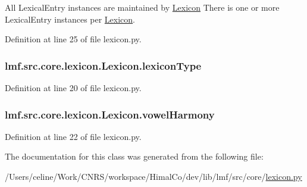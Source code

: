 All Lexical\+Entry instances are maintained by \hyperlink{classlmf_1_1src_1_1core_1_1lexicon_1_1_lexicon}{Lexicon} There is one or more Lexical\+Entry instances per \hyperlink{classlmf_1_1src_1_1core_1_1lexicon_1_1_lexicon}{Lexicon}. 



Definition at line 25 of file lexicon.\+py.

\hypertarget{classlmf_1_1src_1_1core_1_1lexicon_1_1_lexicon_af434e15172d6aa59954db2a72c9f15f0}{
\subsubsection[{lexicon\+Type}]{\setlength{\rightskip}{0pt plus 5cm}lmf.\+src.\+core.\+lexicon.\+Lexicon.\+lexicon\+Type}}\label{classlmf_1_1src_1_1core_1_1lexicon_1_1_lexicon_af434e15172d6aa59954db2a72c9f15f0}


Definition at line 20 of file lexicon.\+py.

\hypertarget{classlmf_1_1src_1_1core_1_1lexicon_1_1_lexicon_a0c55ecd82285a7d3dc5d5ebcb1445c25}{
\subsubsection[{vowel\+Harmony}]{\setlength{\rightskip}{0pt plus 5cm}lmf.\+src.\+core.\+lexicon.\+Lexicon.\+vowel\+Harmony}}\label{classlmf_1_1src_1_1core_1_1lexicon_1_1_lexicon_a0c55ecd82285a7d3dc5d5ebcb1445c25}


Definition at line 22 of file lexicon.\+py.



The documentation for this class was generated from the following file\+:\begin{DoxyCompactItemize}
\item 
/\+Users/celine/\+Work/\+C\+N\+R\+S/workspace/\+Himal\+Co/dev/lib/lmf/src/core/\hyperlink{lexicon_8py}{lexicon.\+py}\end{DoxyCompactItemize}
